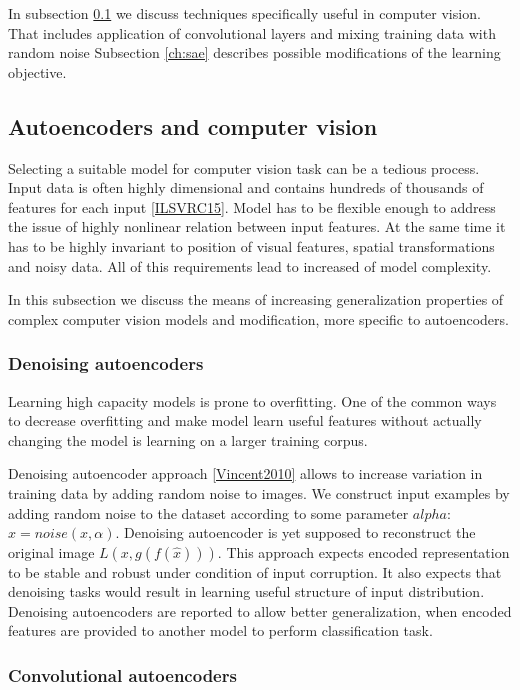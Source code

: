 In subsection \ref{ch:dcae} we discuss techniques specifically useful in computer vision.
That includes application of convolutional layers and mixing training data with random noise
Subsection \ref{ch:sae} describes possible modifications of the learning objective.


\subsection{Autoencoders and computer vision}\label{ch:dcae}

Selecting a suitable model for computer vision task can be a tedious process.
Input data is often highly dimensional and contains hundreds of thousands of features for each input \ref{ILSVRC15}.
Model has to be flexible enough to address the issue of highly nonlinear relation between input features.
At the same time it has to be highly invariant to position of visual features, spatial transformations and noisy data.
All of this requirements lead to increased of model complexity.

In this subsection we discuss the means of increasing generalization properties of complex computer vision models and modification, more specific to autoencoders.

\subsubsection{Denoising autoencoders}

Learning high capacity models is prone to overfitting.
One of the common ways to decrease overfitting and make model learn useful features without actually changing the model is learning on a larger training corpus.

Denoising autoencoder approach \ref{Vincent2010} allows to increase variation in training data by adding random noise to images. We construct input examples by adding random noise to the dataset according to some parameter $alpha$: $\hat{x}=noise(x, \alpha)$.
Denoising autoencoder is yet supposed to reconstruct  the original image $L(x, g(f(\hat{x})))$.
This approach expects encoded representation to be stable and robust under condition of input corruption.
It also expects that denoising tasks would result in learning useful structure of input distribution.
Denoising autoencoders are reported to allow better generalization, when encoded features are provided to another model to perform classification task.

\subsubsection{Convolutional autoencoders}

